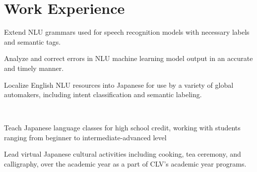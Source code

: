 \documentclass[letterpaper]{deedy-resume_sm} %
\begin{document}

\lastupdated %


\section{Work Experience}
\begin{tightitemize}
\item Extend NLU grammars used for speech recognition models with necessary labels and semantic tags.
\item Analyze and correct errors in NLU machine learning model output in an accurate and timely manner.
\item Localize English NLU resources into Japanese for use by a variety of global automakers, including intent classification and semantic labeling.   
\end{tightitemize}
\\
\begin{tightitemize}
\item Teach Japanese language classes for high school credit, working with students ranging from beginner to intermediate-advanced level
\item Lead virtual Japanese cultural activities including cooking, tea ceremony, and calligraphy, over the academic year as a part of CLV's academic year programs.
\end{tightitemize}
\end{document}
